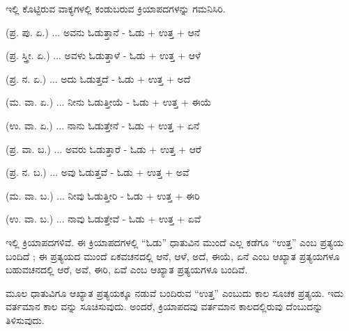 \indent ಇಲ್ಲಿ ಕೊಟ್ಟಿರುವ ವಾಕ್ಯಗಳಲ್ಲಿ ಕಂಡುಬರುವ ಕ್ರಿಯಾಪದಗಳನ್ನು ಗಮನಿಸಿರಿ.\par

\indent (ಪ್ರ. ಪು. ಏ.) ... ಅವನು ಓಡುತ್ತಾನೆ - ಓಡು + ಉತ್ತ + ಆನೆ\par

\indent (ಪ್ರ. ಸ್ತ್ರೀ. ಏ.) ... ಅವಳು ಓಡುತ್ತಾಳೆ - ಓಡು + ಉತ್ತ + ಆಳೆ\par

\indent (ಪ್ರ. ನ. ಏ.) ... ಅದು ಓಡುತ್ತದೆ - ಓಡು + ಉತ್ತ + ಅದೆ\par

\indent (ಮ. ವಾ. ಏ.) ... ನೀನು ಓಡುತ್ತೀಯೆ - ಓಡು + ಉತ್ತ + ಈಯೆ\par

\indent (ಉ. ವಾ. ಏ.) ... ನಾನು ಓಡುತ್ತೇನೆ - ಓಡು + ಉತ್ತ + ಏನೆ\par

\indent (ಪ್ರ. ವಾ. ಬ.) ... ಅವರು ಓಡುತ್ತಾರೆ - ಓಡು + ಉತ್ತ + ಆರೆ\par

\indent (ಪ್ರ. ನ. ಬ.) ... ಅವು ಓಡುತ್ತವೆ - ಓಡು + ಉತ್ತ + ಅವೆ\par

\indent (ಮ. ವಾ. ಬ.) ... ನೀವು ಓಡುತ್ತೀರಿ - ಓಡು + ಉತ್ತ + ಈರಿ\par

\indent (ಉ. ವಾ. ಬ.) ... ನಾವು ಓಡುತ್ತೇವೆ - ಓಡು + ಉತ್ತ + ಏವೆ\par

\indent ಇಲ್ಲಿ ಕ್ರಿಯಾಪದಗಳಿವೆ. ಈ ಕ್ರಿಯಾಪದಗಳಲ್ಲಿ “ಓಡು” ಧಾತುವಿನ ಮುಂದೆ ಎಲ್ಲ ಕಡೆಗೂ “ಉತ್ತ” ಎಂಬ ಪ್ರತ್ಯಯ ಬಂದಿದೆ ; ಈ ಪ್ರತ್ಯಯದ ಮುಂದೆ ಏಕವಚನದಲ್ಲಿ ಆನೆ, ಆಳೆ, ಅದೆ, ಈಯೆ, ಏನೆ ಎಂಬ ಆಖ್ಯಾತ ಪ್ರತ್ಯಯಗಳೂ ಬಹುವಚನದಲ್ಲಿ ಆರೆ, ಅವೆ, ಈರಿ, ಏವೆ ಎಂಬ ಆಖ್ಯಾತ ಪ್ರತ್ಯಯಗಳೂ ಬಂದಿವೆ.\par

\indent ಮೂಲ ಧಾತುವಿಗೂ ಆಖ್ಯಾತ ಪ್ರತ್ಯಯಕ್ಕೂ ನಡುವೆ ಬಂದಿರುವ “ಉತ್ತ” ಎಂಬುದು ಕಾಲ ಸೂಚಕ ಪ್ರತ್ಯಯ. ಇದು ವರ್ತಮಾನ ಕಾಲ ವನ್ನು ಸೂಚಿಸುವುದು. ಅಂದರೆ, ಕ್ರಿಯಾಪದವು ವರ್ತಮಾನ ಕಾಲದಲ್ಲಿರುವು ದೆಂಬುದನ್ನು ತಿಳಿಸುವುದು.\par


\begin{kbvderiv}
\vspace{4pt plus 3pt minus 1pt}
\vspace{4pt plus 3pt minus 1pt}
\end{kbvderiv}
